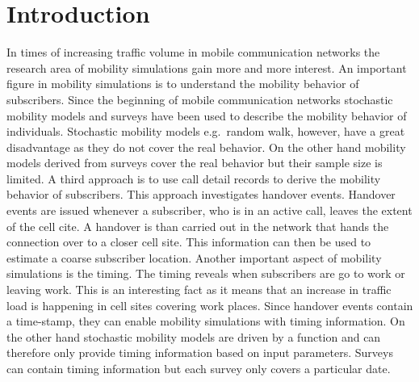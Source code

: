\documentclass[master,english]{hgbthesis}
\begin{document}
\chapter{Introduction}
In times of increasing traffic volume in mobile communication networks the research area of mobility simulations gain more and more interest. An important figure in mobility simulations is to understand the mobility behavior of subscribers. Since the beginning of mobile communication networks stochastic mobility models and surveys have been used to describe the mobility behavior of individuals. 
Stochastic mobility models e.g.\ random walk, however, have a great disadvantage as they do not cover the real behavior. On the other hand mobility models derived from surveys cover the real behavior but their sample size is limited. A third approach is to use call detail records to derive the mobility behavior of subscribers.
This approach investigates handover events. Handover events are issued whenever a subscriber, who is in an active call, leaves the extent of the cell cite. A handover is than carried out in the network that hands the connection over to a closer cell site. This information can then be used to estimate a coarse subscriber location.
Another important aspect of mobility simulations is the timing. The timing reveals when subscribers are go to work or leaving work. This is an interesting fact as it means that an increase in traffic load is happening in cell sites covering work places. Since handover events contain a time-stamp, they can enable mobility simulations with timing information. On the other hand stochastic mobility models are driven by a function and can therefore only provide timing information based on input parameters. Surveys can contain timing information but each survey only covers a particular date. 
\end{document}
